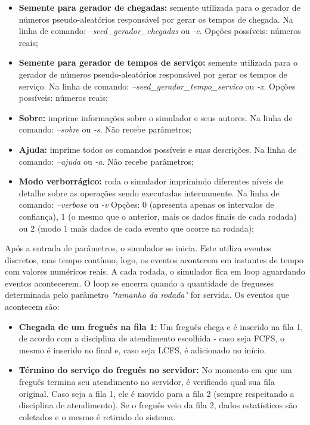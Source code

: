 \documentclass[a4paper,10pt]{article}
\begin{document}
\begin {itemize}
\item \textbf{Semente para gerador de chegadas:} semente utilizada para o gerador de números pseudo-aleatórios responsável por gerar os tempos de chegada. Na linha de comando: \emph{--seed\_gerador\_chegadas} ou \emph{-c}. Opções possíveis: números reais;

\item \textbf{Semente para gerador de tempos de serviço:} semente utilizada para o gerador de números pseudo-aleatórios responsável por gerar os tempos de serviço. Na linha de comando: \emph{--seed\_gerador\_tempo\_servico} ou \emph{-x}. Opções possíveis: números reais;

\item \textbf{Sobre:} imprime informações sobre o simulador e seus autores. Na linha de comando: \emph{--sobre} ou \emph{-s}. Não recebe parâmetros;

\item \textbf{Ajuda:} imprime todos os comandos possíveis e suas descrições. Na linha de comando: \emph{--ajuda} ou \emph{-a}. Não recebe parâmetros;

\item \textbf{Modo verborrágico:} roda o simulador imprimindo diferentes níveis de detalhe sobre as operações sendo executadas internamente. Na linha de comando: \emph{--verbose} ou \emph{-v} Opções: 0 (apresenta apenas os intervalos de confiança), 1 (o mesmo que o anterior, mais os dados finais de cada rodada) ou 2 (modo 1 mais dados de cada evento que ocorre na rodada);
\end {itemize}

    Após a entrada de parâmetros, o simulador se inicia. Este utiliza eventos discretos, mas tempo contínuo, logo, os eventos acontecem em instantes de tempo com valores numéricos reais. A cada rodada, o simulador fica em loop aguardando eventos acontecerem. O loop se encerra quando a quantidade de fregueses determinada pelo parâmetro \emph{"tamanho da rodada"} for servida. Os eventos que acontecem são:

\begin {itemize}
\item \textbf{Chegada de um freguês na fila 1:} Um freguês chega e é inserido na fila 1, de acordo com a disciplina de atendimento escolhida - caso seja FCFS, o mesmo é inserido no final e, caso seja LCFS, é adicionado no início.

\item \textbf{Término do serviço do freguês no servidor:} No momento em que um freguês termina seu atendimento no servidor, é verificado qual sua fila original. Caso seja a fila 1,
ele é movido para a fila 2 (sempre respeitando a disciplina de atendimento). Se o freguês veio da fila 2, dados estatísticos são coletados e o mesmo é retirado do sistema.
\end {itemize}
\end{document}
